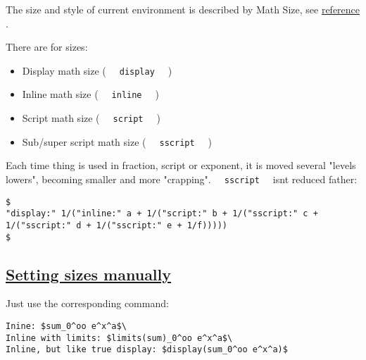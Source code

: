 The size and style of current environment is described by Math Size, see
\href{https://typst.app/docs/reference/math/sizes}{reference} .

There are for sizes:

\begin{itemize}
\tightlist
\item
  Display math size ( \texttt{\ }{\texttt{\ display\ }}\texttt{\ } )
\item
  Inline math size ( \texttt{\ }{\texttt{\ inline\ }}\texttt{\ } )
\item
  Script math size ( \texttt{\ }{\texttt{\ script\ }}\texttt{\ } )
\item
  Sub/super script math size (
  \texttt{\ }{\texttt{\ sscript\ }}\texttt{\ } )
\end{itemize}

Each time thing is used in fraction, script or exponent, it is moved
several "levels lowers", becoming smaller and more "crapping".
\texttt{\ }{\texttt{\ sscript\ }}\texttt{\ } isn\textquotesingle t
reduced father:

\begin{verbatim}
$
"display:" 1/("inline:" a + 1/("script:" b + 1/("sscript:" c + 1/("sscript:" d + 1/("sscript:" e + 1/f)))))
$
\end{verbatim}

\pandocbounded{}

\subsection{\texorpdfstring{\hyperref[setting-sizes-manually]{Setting
sizes manually}}{Setting sizes manually}}\label{setting-sizes-manually}

Just use the corresponding command:

\begin{verbatim}
Inine: $sum_0^oo e^x^a$\
Inline with limits: $limits(sum)_0^oo e^x^a$\
Inline, but like true display: $display(sum_0^oo e^x^a)$
\end{verbatim}

\pandocbounded{}


